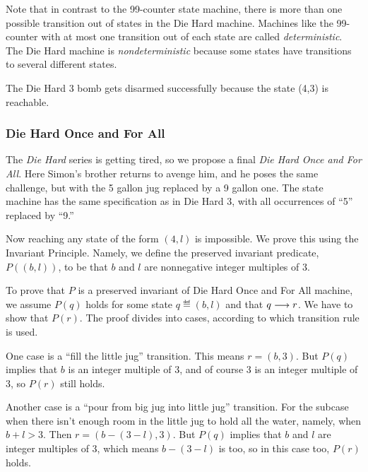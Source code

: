 Note that in contrast to the 99-counter state machine, there is more than
one possible transition out of states in the Die Hard machine.  Machines
like the 99-counter with at most one transition out of each state are
called \emph{deterministic}.  The Die Hard machine is
\emph{nondeterministic} because some states have transitions to several
different states.

The Die Hard 3 bomb gets disarmed successfully because the state (4,3)
is reachable.



\subsubsection{Die Hard Once and For All}
The \emph{Die Hard} series is getting tired, so we propose a final
\emph{Die Hard Once and For All}.  Here Simon's brother returns to
avenge him, and he poses the same challenge, but with the 5 gallon jug
replaced by a 9 gallon one.  The state machine has the same
specification as in Die Hard 3, with all occurrences of ``5'' replaced
by ``9.''

Now reaching any state of the form $(4,l)$ is impossible.  We prove this
using the Invariant Principle.  Namely, we define the preserved invariant
predicate, $P((b,l))$, to be that $b$ and $l$ are nonnegative integer
multiples of 3.

To prove that $P$ is a preserved invariant of Die Hard Once and For
All machine, we assume $P(q)$ holds for some state $q \eqdef (b,l)$
and that $q \mathrel{\longrightarrow} r$.  We have to show that $P(r)$.  The proof
divides into cases, according to which transition rule is used.

One case is a ``fill the little jug'' transition.  This means $r =
(b,3)$.  But $P(q)$ implies that $b$ is an integer multiple of 3, and
of course 3 is an integer multiple of 3, so $P(r)$ still holds.

Another case is a ``pour from big jug into little jug'' transition.
For the subcase when there isn't enough room in the little jug to hold
all the water, namely, when $b + l > 3$.  Then $r = (b -( 3 -l), 3)$.
But $P(q)$ implies that $b$ and $l$ are integer multiples of 3, which
means $b -( 3 -l)$ is too, so in this case too, $P(r)$ holds.

